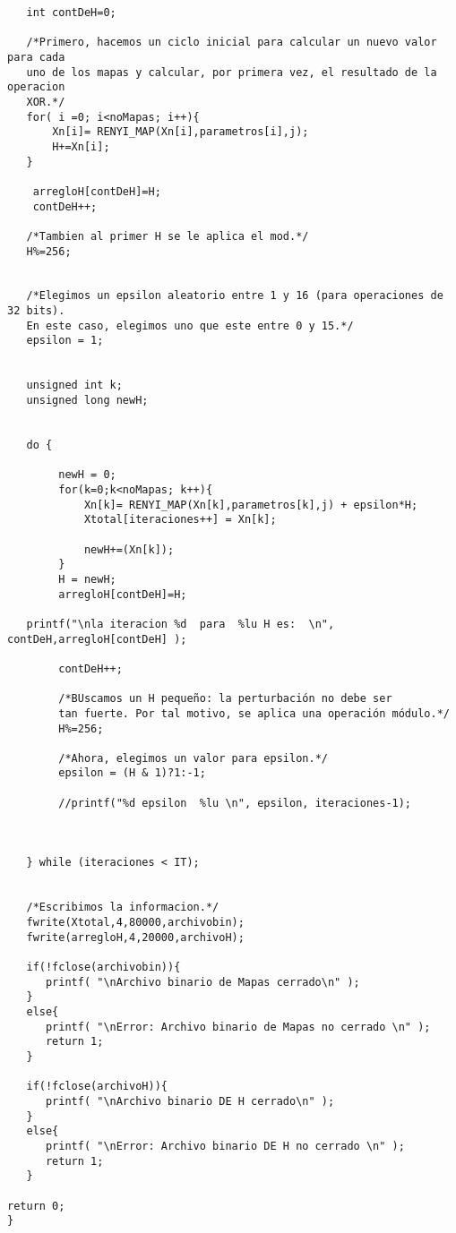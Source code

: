 \documentclass[12pt,3p]{elsarticle}
\begin{document}
\begin{verbatim}
   int contDeH=0;
   
   /*Primero, hacemos un ciclo inicial para calcular un nuevo valor para cada
   uno de los mapas y calcular, por primera vez, el resultado de la operacion
   XOR.*/
   for( i =0; i<noMapas; i++){
       Xn[i]= RENYI_MAP(Xn[i],parametros[i],j);
       H+=Xn[i];
   }
    
    arregloH[contDeH]=H; 
    contDeH++;
   
   /*Tambien al primer H se le aplica el mod.*/
   H%=256; 
   
   
   /*Elegimos un epsilon aleatorio entre 1 y 16 (para operaciones de 32 bits).
   En este caso, elegimos uno que este entre 0 y 15.*/
   epsilon = 1;   
  
      
   unsigned int k;
   unsigned long newH;
   
  
   do {
        
        newH = 0;
        for(k=0;k<noMapas; k++){            
            Xn[k]= RENYI_MAP(Xn[k],parametros[k],j) + epsilon*H;
            Xtotal[iteraciones++] = Xn[k];
             
            newH+=(Xn[k]);      
        }
        H = newH;
        arregloH[contDeH]=H;
        
   printf("\nla iteracion %d  para  %lu H es:  \n", contDeH,arregloH[contDeH] );

        contDeH++;
    
        /*BUscamos un H pequeño: la perturbación no debe ser 
        tan fuerte. Por tal motivo, se aplica una operación módulo.*/
        H%=256;
        
        /*Ahora, elegimos un valor para epsilon.*/
        epsilon = (H & 1)?1:-1;
        
        //printf("%d epsilon  %lu \n", epsilon, iteraciones-1); 
     
 

   } while (iteraciones < IT);

   
   /*Escribimos la informacion.*/
   fwrite(Xtotal,4,80000,archivobin); 
   fwrite(arregloH,4,20000,archivoH); 

   if(!fclose(archivobin)){
      printf( "\nArchivo binario de Mapas cerrado\n" );
   }
   else{
      printf( "\nError: Archivo binario de Mapas no cerrado \n" );
      return 1;
   }
   
   if(!fclose(archivoH)){
      printf( "\nArchivo binario DE H cerrado\n" );
   }
   else{
      printf( "\nError: Archivo binario DE H no cerrado \n" );
      return 1;
   }
   
return 0;
}
\end{verbatim}
\end{document}
